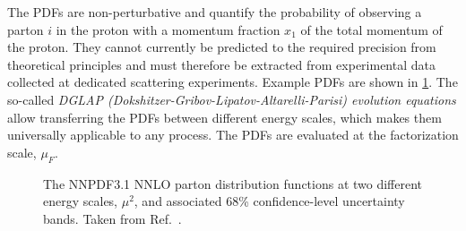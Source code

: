 The PDFs are non-perturbative and quantify the probability of observing a parton $i$ in the proton with a momentum fraction $x_1$ of the total momentum of the proton.
They cannot currently be predicted to the required precision from theoretical principles and must therefore be extracted from experimental data collected at dedicated scattering experiments.
Example PDFs are shown in \cref{fig:pdfs}.
The so-called \emph{DGLAP (Dokshitzer-Gribov-Lipatov-Altarelli-Parisi) evolution equations} \cite{Dokshitzer:1977sg,GRIBOV197178,Altarelli:1977zs} allow transferring the PDFs between different energy scales, which makes them universally applicable to any process. The PDFs are evaluated at the factorization scale, $\mu_F$. 

\begin{figure}
  \caption[The NNPDF3.1 NNLO parton distribution functions at two different energy scales, $\mu^2$, and associated 68\% confidence-level uncertainty bands.]{The NNPDF3.1 NNLO parton distribution functions at two different energy scales, $\mu^2$, and associated 68\% confidence-level uncertainty bands. Taken from Ref.~\cite{2017NNPDF}.}
  \label{fig:pdfs}
\end{figure}

